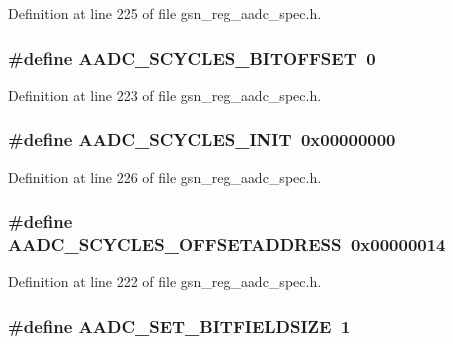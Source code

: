 Definition at line 225 of file gsn\_\-reg\_\-aadc\_\-spec.h.

\hypertarget{a00543_a0497402184a85d9460ecddc74e561656}{
\subsubsection[{AADC\_\-SCYCLES\_\-BITOFFSET}]{\setlength{\rightskip}{0pt plus 5cm}\#define AADC\_\-SCYCLES\_\-BITOFFSET~0}}
\label{a00543_a0497402184a85d9460ecddc74e561656}


Definition at line 223 of file gsn\_\-reg\_\-aadc\_\-spec.h.

\hypertarget{a00543_af2fc78ab0b38d1b0fb347374d3443dab}{
\subsubsection[{AADC\_\-SCYCLES\_\-INIT}]{\setlength{\rightskip}{0pt plus 5cm}\#define AADC\_\-SCYCLES\_\-INIT~0x00000000}}
\label{a00543_af2fc78ab0b38d1b0fb347374d3443dab}


Definition at line 226 of file gsn\_\-reg\_\-aadc\_\-spec.h.

\hypertarget{a00543_a8993204e9cf1690042e5a459e4cf6a65}{
\subsubsection[{AADC\_\-SCYCLES\_\-OFFSETADDRESS}]{\setlength{\rightskip}{0pt plus 5cm}\#define AADC\_\-SCYCLES\_\-OFFSETADDRESS~0x00000014}}
\label{a00543_a8993204e9cf1690042e5a459e4cf6a65}


Definition at line 222 of file gsn\_\-reg\_\-aadc\_\-spec.h.

\hypertarget{a00543_a0b7f942a85dda2912fd71af06318354d}{
\subsubsection[{AADC\_\-SET\_\-BITFIELDSIZE}]{\setlength{\rightskip}{0pt plus 5cm}\#define AADC\_\-SET\_\-BITFIELDSIZE~1}}
\label{a00543_a0b7f942a85dda2912fd71af06318354d}


